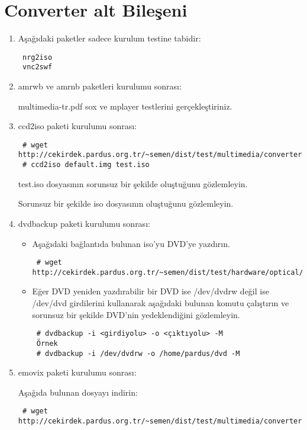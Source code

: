 \documentclass[a4paper,10pt]{article}
\begin{document}
\section{Converter alt Bileşeni}
\begin{enumerate}
 \item Aşağıdaki paketler sadece kurulum testine tabidir:
\begin{verbatim}
 nrg2iso
 vnc2swf
\end{verbatim}

 \item amrwb ve amrnb paketleri kurulumu sonrası:

 multimedia-tr.pdf sox ve mplayer testlerini gerçekleştiriniz.

\item ccd2iso paketi kurulumu sonrası:
\begin{verbatim}
 # wget http://cekirdek.pardus.org.tr/~semen/dist/test/multimedia/converter/default.img
 # ccd2iso default.img test.iso
\end{verbatim}

test.iso dosyasının sorunsuz bir şekilde oluştuğunu gözlemleyin.

Sorunsuz bir şekilde iso dosyasının oluştuğunu gözlemleyin.
\item dvdbackup paketi kurulumu sonrası:
\begin{itemize}
 \item Aşağıdaki bağlantıda bulunan iso'yu DVD'ye yazdırın. 
\begin{verbatim}
 # wget http://cekirdek.pardus.org.tr/~semen/dist/test/hardware/optical/boot.iso
\end{verbatim}
 \item Eğer DVD yeniden yazdırabilir bir DVD ise /dev/dvdrw değil ise /dev/dvd girdilerini kullanarak aşağıdaki bulunan komutu çalıştırın ve sorunsuz bir şekilde DVD'nin yedeklendiğini gözlemleyin.
\begin{verbatim}
 # dvdbackup -i <girdiyolu> -o <çıktıyolu> -M
 Örnek 
 # dvdbackup -i /dev/dvdrw -o /home/pardus/dvd -M
\end{verbatim}
 
\end{itemize}
\item emovix paketi kurulumu sonrası:

Aşağıda bulunan dosyayı indirin:
\begin{verbatim}
 # wget http://cekirdek.pardus.org.tr/~semen/dist/test/multimedia/converter/default.img
\end{verbatim}
 

\end{enumerate}
\end{document}
